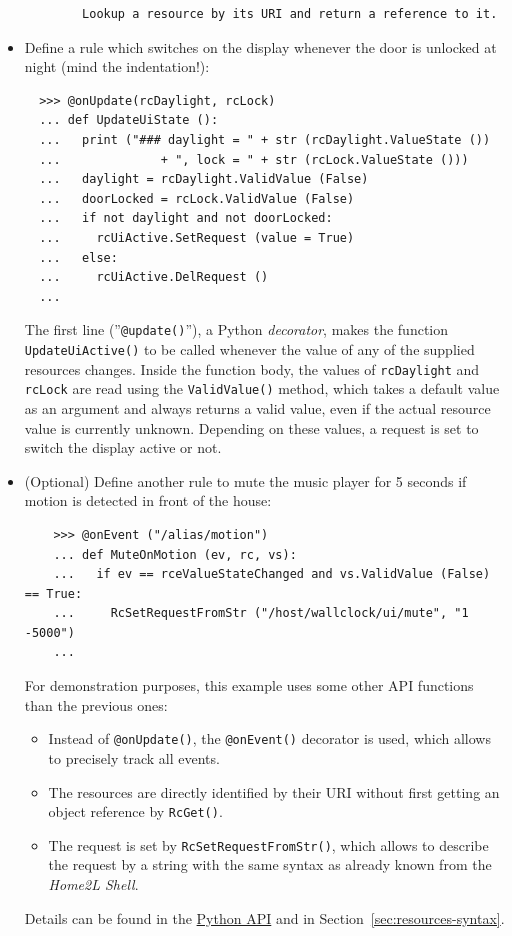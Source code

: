 \documentclass[12pt,english,parskip=half]{scrreprt}
\newcommand{\projecturl}{}
\newcommand{\docref}[2]{\href{\projecturl#1}{#2}}
\newcommand{\refapipython}{\docref{home2l-api_python/index.html}{Python API}}
\begin{document}
\begin{itemize}[$\blacktriangleright$]
\begin{lstlisting}
        Lookup a resource by its URI and return a reference to it.
  \end{lstlisting}

\item
  Define a rule which switches on the display whenever the door is unlocked at night
  (mind the indentation!):
  \begin{lstlisting}
  >>> @onUpdate(rcDaylight, rcLock)
  ... def UpdateUiState ():
  ...   print ("### daylight = " + str (rcDaylight.ValueState ())
  ...              + ", lock = " + str (rcLock.ValueState ()))
  ...   daylight = rcDaylight.ValidValue (False)
  ...   doorLocked = rcLock.ValidValue (False)
  ...   if not daylight and not doorLocked:
  ...     rcUiActive.SetRequest (value = True)
  ...   else:
  ...     rcUiActive.DelRequest ()
  ...
  \end{lstlisting}

  The first line (''\texttt{@update()}''), a Python \emph{decorator},
  makes the function \texttt{UpdateUiActive()} to be called whenever
  the value of any of the supplied resources changes. Inside the function
  body, the values of \texttt{rcDaylight} and \texttt{rcLock} are
  read using the \texttt{ValidValue()} method, which takes a default
  value as an argument and always returns a valid value, even if the
  actual resource value is currently unknown. Depending on these values, a
  request is set to switch the display active or not.

\item
  (Optional) Define another rule to mute the music player for 5 seconds
  if motion is detected in front of the house:
  \begin{lstlisting}
    >>> @onEvent ("/alias/motion")
    ... def MuteOnMotion (ev, rc, vs):
    ...   if ev == rceValueStateChanged and vs.ValidValue (False) == True:
    ...     RcSetRequestFromStr ("/host/wallclock/ui/mute", "1 -5000")
    ...
  \end{lstlisting}

  For demonstration purposes, this example uses some other API functions
  than the previous ones:
  \begin{itemize}
    \item
      Instead of \texttt{@onUpdate()}, the \texttt{@onEvent()} decorator is used,
      which allows to precisely track all events.
    \item
      The resources are directly identified by their URI without first getting
      an object reference by \texttt{RcGet()}.
    \item
      The request is set by \texttt{RcSetRequestFromStr()}, which allows to describe the request
      by a string with the same syntax as already known from the \emph{Home2L Shell}.
  \end{itemize}
  Details can be found in the \refapipython{} and in Section~\ref{sec:resources-syntax}.


\end{itemize}
\end{document}
